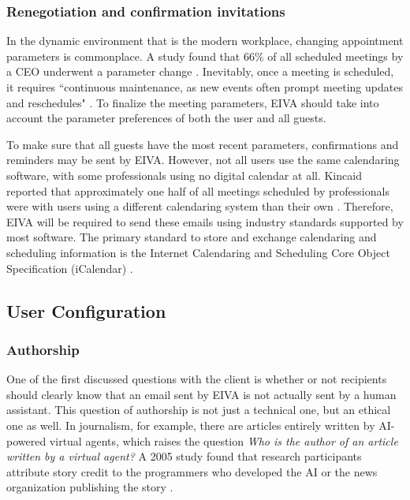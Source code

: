\documentclass{article}
\begin{document}
\subsubsection{Renegotiation and confirmation invitations}

In the dynamic environment that is the modern workplace, changing appointment parameters is commonplace. A study found that 66\% of all scheduled meetings by a CEO underwent a parameter change \cite{dennis_how_2018}. Inevitably, once a meeting is scheduled, it requires ``continuous maintenance, as new events often prompt meeting updates and reschedules" \cite{cranshaw_calendar.help:_2017}. To finalize the meeting parameters, EIVA should take into account the parameter preferences of both the user and all guests.

To make sure that all guests have the most recent parameters, confirmations and reminders may be sent by EIVA. However, not all users use the same calendaring software, with some professionals using no digital calendar at all. Kincaid reported that approximately one half of all meetings scheduled by professionals were with users using a different calendaring system than their own \cite{kincaid_electronic_1985}. Therefore, EIVA will be required to send these emails using industry standards supported by most software. The primary standard to store and exchange calendaring and scheduling information is the Internet Calendaring and Scheduling Core Object Specification (iCalendar) \cite{desruisseaux_internet_2009}.

\subsection{User Configuration}

\subsubsection{Authorship}

One of the first discussed questions with the client is whether or not recipients should clearly know that an email sent by EIVA is not actually sent by a human assistant. This question of authorship is not just a technical one, but an ethical one as well. In journalism, for example, there are articles entirely written by AI-powered virtual agents, which raises the question \emph{Who is the author of an article written by a virtual agent?} A 2005 study found that research participants attribute story credit to the programmers who developed the AI or the news organization publishing the story \cite{montal_i_2017}.
\end{document}
